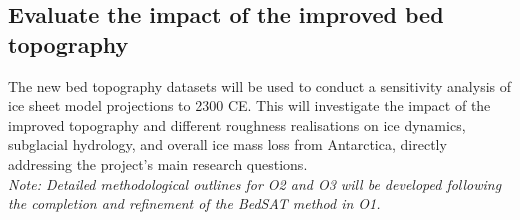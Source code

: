 \subsection{Evaluate the impact of the improved bed topography}
The new bed topography datasets will be used to conduct a sensitivity analysis of ice sheet model projections to 2300 CE. This will investigate the impact of the improved topography and different roughness realisations on ice dynamics, subglacial hydrology, and overall ice mass loss from Antarctica, directly addressing the project's main research questions.
\\
\textit{Note: Detailed methodological outlines for O2 and O3 will be developed following the completion and refinement of the BedSAT method in O1.}


